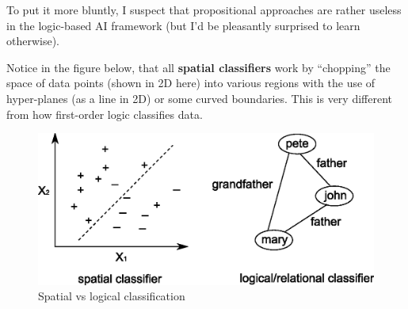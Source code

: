 To put it more bluntly, I suspect that propositional approaches are rather useless in the logic-based AI framework (but I'd be pleasantly surprised to learn otherwise).

Notice in the figure below, that all \textbf{spatial classifiers} work by ``chopping'' the space of data points (shown in 2D here) into various regions with the use of hyper-planes (as a line in 2D) or some curved boundaries.  This is very different from how first-order logic classifies data.

\begin{figure}[H]
\includegraphics{spatial-vs-logical.eps}
\caption{Spatial vs logical classification}
\end{figure}

